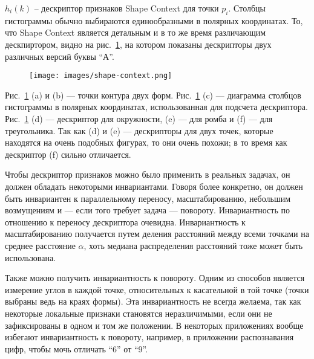$h_i(k)$ -- дескриптор признаков Shape Context для точки $p_i$. Столбцы гистограммы обычно выбираются единообразными в полярных координатах. То, что Shape Context является детальным и в то же время различающим дескпиртором, видно на рис.~\ref{shape-context}, на котором показаны дескрипторы двух различных версий буквы ``А''.

\begin{figure}
  \centering
  \texttt{[image: images/shape-context.png]}
  \caption{\label{shape-context}}
\end{figure}

Рис.~\ref{shape-context} (a) и (b) --- точки контура двух форм. Рис.~\ref{shape-context} (c) --- диаграмма столбцов гистограммы в полярных координатах, использованная для подсчета дескриптора. Рис.~\ref{shape-context} (d) --- дескриптор для окружности, (e) --- для ромба и (f) --- для треугольника. Так как (d) и (e) --- дескрипторы для двух точек, которые находятся на очень подобных фигурах, то они очень похожи; в то время как дескриптор (f) сильно отличается.

Чтобы дескриптор признаков можно было применить в реальных задачах, он должен обладать некоторыми инвариантами. Говоря более конкретно, он должен быть инвариантен к параллельному переносу, масштабированию, небольшим возмущениям и --- если того требует задача --- повороту. Инвариантность по отношению к переносу дескриптора очевидна. Инвариантность к масштабированию получается путем деления расстояний между всеми точками на среднее расстояние $\alpha$, хоть медиана распределения расстояний тоже может быть использована.

Также можно получить инвариантность к повороту. Одним из способов является измерение углов в каждой точке, относительных к касательной в той точке (точки выбраны ведь на краях формы). Эта инвариантность не всегда желаема, так как некоторые локальные признаки становятся неразличимыми, если они не зафиксированы в одном и том же положении. В некоторых приложениях вообще избегают инвариантность к повороту, например, в приложении распознавания цифр, чтобы мочь отличать ``6'' от ``9''.

